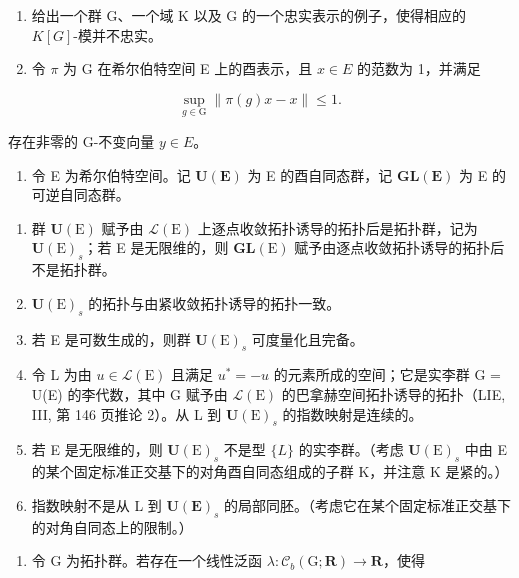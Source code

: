 \exercisesection{}

\begin{enumerate}
\def\labelenumi{\arabic{enumi})}
\item
  给出一个群 G、一个域 K 以及 G 的一个忠实表示的例子，使得相应的 \(K[G]\)-模并不忠实。
\item
  令 \(\pi\) 为 G 在希尔伯特空间 E 上的酉表示，且 \(x \in E\) 的范数为 1，并满足
\end{enumerate}

\[
\sup _ {g \in \mathrm{G}} \| \pi (g) x - x \| \leqslant 1.
\]

存在非零的 G-不变向量 \(y \in E\)。

\begin{enumerate}
\def\labelenumi{\arabic{enumi})}
\setcounter{enumi}{2}
\tightlist
\item
  令 E 为希尔伯特空间。记 \(\mathbf{U}(\mathbf{E})\) 为 E 的酉自同态群，记 \(\mathbf{GL}(\mathbf{E})\) 为 E 的可逆自同态群。
\end{enumerate}

\begin{enumerate}
\def\labelenumi{\alph{enumi})}
\item
  群 \(\mathbf{U}(\mathrm{E})\) 赋予由 \(\mathcal{L}(\mathrm{E})\) 上逐点收敛拓扑诱导的拓扑后是拓扑群，记为 \(\mathbf{U}(\mathrm{E})_{s}\)；若 E 是无限维的，则 \(\mathbf{GL}(\mathrm{E})\) 赋予由逐点收敛拓扑诱导的拓扑后不是拓扑群。
\item
  \(\mathbf{U}(\mathrm{E})_{s}\) 的拓扑与由紧收敛拓扑诱导的拓扑一致。
\item
  若 E 是可数生成的，则群 \(\mathbf{U}(\mathrm{E})_{s}\) 可度量化且完备。
\item
  令 L 为由 \(u \in \mathcal{L}(\mathrm{E})\) 且满足 \(u^{*} = -u\) 的元素所成的空间；它是实李群 G = U(E) 的李代数，其中 G 赋予由 \(\mathcal{L}(\mathrm{E})\) 的巴拿赫空间拓扑诱导的拓扑（LIE, III, 第 146 页推论 2）。从 L 到 \(\mathbf{U}(\mathrm{E})_s\) 的指数映射是连续的。
\item
  若 E 是无限维的，则 \(\mathbf{U}(\mathrm{E})_{s}\) 不是型 \(\{L\}\) 的实李群。（考虑 \(\mathbf{U}(\mathrm{E})_{s}\) 中由 E 的某个固定标准正交基下的对角酉自同态组成的子群 K，并注意 K 是紧的。）
\item
  指数映射不是从 L 到 \(\mathbf{U}(\mathbf{E})_{s}\) 的局部同胚。（考虑它在某个固定标准正交基下的对角自同态上的限制。）
\end{enumerate}

\begin{enumerate}
\def\labelenumi{\arabic{enumi})}
\setcounter{enumi}{3}
\tightlist
\item
  令 G 为拓扑群。若存在一个线性泛函 \(\lambda\colon\mathcal{C}_{b}(\mathrm{G};\mathbf{R})\to\mathbf{R}\)，使得
\end{enumerate}

